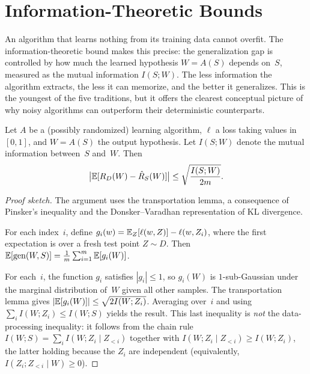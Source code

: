 
\section{Information-Theoretic Bounds}
\label{sec:info-bound}

An algorithm that learns nothing from its training data cannot overfit. The information-theoretic bound makes this precise: the generalization gap is controlled by how much the learned hypothesis $W = A(S)$ depends on~$S$, measured as the mutual information $I(S; W)$. The less information the algorithm extracts, the less it can memorize, and the better it generalizes. This is the youngest of the five traditions, but it offers the clearest conceptual picture of why noisy algorithms can outperform their deterministic counterparts.

\begin{thm}
\label{thm:xu-raginsky}
Let $A$ be a (possibly randomized) learning algorithm, $\ell$ a loss
taking values in $[0,1]$, and $W = A(S)$ the output hypothesis.  Let
$I(S; W)$ denote the mutual information between~$S$ and~$W$.  Then
\[
  \bigl|\mathbb{E}[R_D(W) - \hat{R}_S(W)]\bigr|
  \leq \sqrt{\frac{I(S; W)}{2m}}.
\]
\end{thm}

\begin{proof}[Proof sketch]
The argument uses the transportation lemma, a consequence of Pinsker's
inequality and the Donsker--Varadhan representation of KL divergence.

For each index~$i$, define
$g_i(w) = \mathbb{E}_Z[\ell(w, Z)] - \ell(w, Z_i)$, where the first expectation
is over a fresh test point $Z \sim D$.  Then
$\mathbb{E}[\mathrm{gen}(W,S)] = \frac{1}{m}\sum_{i=1}^m \mathbb{E}[g_i(W)]$.

For each~$i$, the function $g_i$ satisfies $|g_i| \leq 1$, so $g_i(W)$
is $1$-sub-Gaussian under the marginal distribution of~$W$ given all
other samples.  The transportation lemma gives
$|\mathbb{E}[g_i(W)]| \leq \sqrt{2 I(W; Z_i)}$.
Averaging over~$i$ and using $\sum_i I(W; Z_i) \leq I(W; S)$ yields the
result.  This last inequality is \emph{not} the data-processing inequality:
it follows from the chain rule
$I(W; S) = \sum_i I(W; Z_i \mid Z_{<i})$ together with
$I(W; Z_i \mid Z_{<i}) \geq I(W; Z_i)$, the latter holding because the $Z_i$
are independent (equivalently, $I(Z_i; Z_{<i} \mid W) \geq 0$).
\end{proof}

